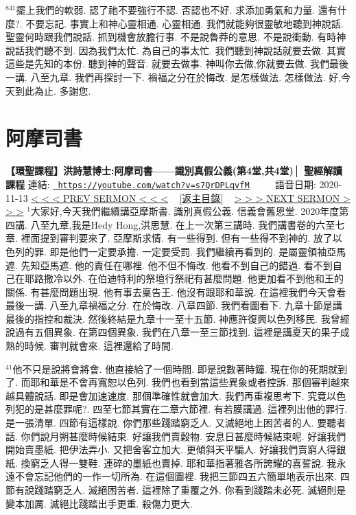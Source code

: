 \documentclass{book}
\begin{document}
$^{841}$擺上我們的軟弱.
認了祂不要強行不認.
否認也不好.
求添加勇氣和力量.
還有什麼?.
不要忘記.
事實上和神心靈相通.
心靈相通.
我們就能夠很靈敏地聽到神說話.
聖靈何時跟我們說話.
抓到機會放膽行事.
不是說魯莽的意思.
不是說衝動.
有時神說話我們聽不到.
因為我們太忙.
為自己的事太忙.
我們聽到神說話就要去做.
其實這些是先知的本份.
聽到神的聲音.
就要去做事.
神叫你去做,你就要去做.
我們最後一講.
八至九章.
我們再探討一下.
禍福之分在於悔改.
是怎樣做法.
怎樣做法.
好,今天到此為止.
多謝您.
\newpage



\section{阿摩司書}
\label{sec:s7QrDPLqvfM}
\textbf{【環聖課程】洪詩慧博士:阿摩司書——識別真假公義(第4堂,共4堂)│ 聖經解讀課程}
\newline
\newline
連結: \href{https://youtube.com/watch?v=s7QrDPLqvfM}{\texttt{ https://youtube.com/watch?v=s7QrDPLqvfM}} ~~~~ 語音日期: 2020-11-13 
\newline
\newline
\hyperref[sec:3OmAEo3dSsg]{\small{< < < PREV SERMON < < <}}
~
\hyperref[sec:index]{\small{[返主目錄]}}
~
\hyperref[sec:ovzkHTnXBCk]{\small{> > > NEXT SERMON > > >}}
\newline
\newline
$^{1}$大家好,今天我們繼續講亞摩斯書.
識別真假公義.
信義會舊恩堂.
2020年度第四講.
八至九章,我是Hedy Hong,洪思慧.
在上一次第三講時.
我們講書卷的六至七章.
裡面提到審判要來了.
亞摩斯求情.
有一些得到.
但有一些得不到神的.
放了以色列的罪.
即是他們一定要承擔.
一定要受罰.
我們繼續再看到的.
是屬靈領袖亞馬遮.
先知亞馬遮.
他的責任在哪裡.
他不但不悔改.
他看不到自己的錯過.
看不到自己在耶路撒冷以外.
在伯迪特利的祭壇行祭祀有甚麼問題.
他更加看不到他和王的關係.
有甚麼問題出現.
他有事去稟告王.
他沒有跟耶和華說.
在這裡我們今天會看最後一講.
八至九章禍福之分.
在於悔改.
八章四節.
我們看圖看下.
九章十節是講最後的指控和裁決.
然後終結是九章十一至十五節.
神應許復興以色列移民.
我曾經說過有五個異象.
在第四個異象.
我們在八章一至三節找到.
這裡是講夏天的果子成熟的時候.
審判就會來.
這裡還給了時間.

$^{41}$他不只是說將會將會.
他直接給了一個時間.
即是說數著時鐘.
現在你的死期就到了.
而耶和華是不會再寬恕以色列.
我們也看到當這些異象或者控訴.
那個審判越來越具體說話.
即是會加速速度.
那個準確性就會加大.
我們再重複思考下.
究竟以色列犯的是甚麼罪呢?.
四至七節其實在二章六節裡.
有若膜講過.
這裡列出他的罪行.
是一張清單.
四節有這樣說.
你們那些踐踏窮乏人.
又滅絕地上困苦者的人.
要聽者話.
你們說月朔甚麼時候結束.
好讓我們賣穀物.
安息日甚麼時候結束呢.
好讓我們開始賣墨紙.
把伊法弄小.
又把舍客立加大.
更傾斜天平騙人.
好讓我們賣窮人得銀紙.
換窮乏人得一雙鞋.
連碎的墨紙也賣掉.
耶和華指著雅各所誇耀的喜誓說.
我永遠不會忘記他們的一作一切所為.
在這個圖裡.
我把三節四五六簡單地表示出來.
四節有說踐踏窮乏人.
滅絕困苦者.
這裡除了重覆之外.
你看到踐踏未必死.
滅絕則是變本加厲.
滅絕比踐踏出手更重.
殺傷力更大.
\end{document}
